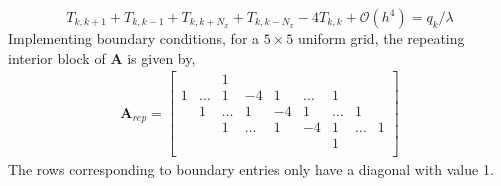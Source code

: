 \documentclass[12pt]{amsart}   %
\begin{document}
\begin{equation}
     T_{k,k+1} + T_{k,k-1}+T_{k,k+N_x} + T_{k,k-N_x} -4T_{k,k} +\mathcal{O}(h^4) = q_{k} / \lambda
\end{equation}
Implementing boundary conditions, for a $5\times5$ uniform grid, the repeating interior block of $\mathbf{A}$ is given by,
                    \begin{align*}
                    \mathbf{A}_{rep} = \left[\begin{matrix}
                    &&1\\ 1&\hdots&1&-4&1&\hdots&1\\
                     &1&\hdots&1&-4&1&\hdots&1\\
                     &&1&\hdots&1&-4&1&\hdots&1\\
                    &&&&&&1\\
                    \end{matrix}\right]
                \end{align*}
The rows corresponding to boundary entries only have a diagonal with value 1. 
\end{document}
